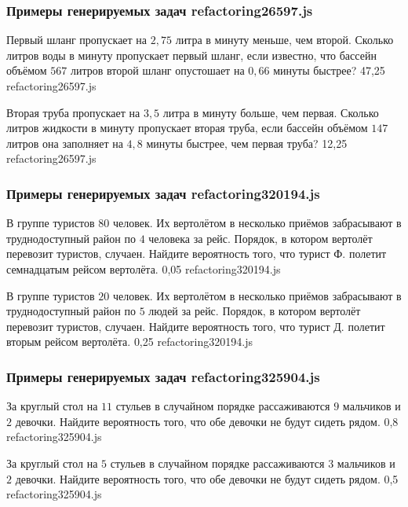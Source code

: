
\subsubsection*{Примеры генерируемых задач refactoring26597.js}
 
\par{Первый шланг пропускает на $2,75$ литра в минуту меньше, чем второй. Сколько литров воды в минуту пропускает первый шланг, если известно, что бассейн объёмом $567$ литров второй шланг опустошает на $0,66$ минуты быстрее? }{ 47,25 }{refactoring26597.js}
\par{Вторая труба пропускает на $3,5$ литра в минуту больше, чем первая. Сколько литров жидкости в минуту пропускает вторая труба, если бассейн объёмом $147$ литров она заполняет на $4,8$ минуты быстрее, чем первая труба? }{ 12,25 }{refactoring26597.js}


\subsubsection*{Примеры генерируемых задач refactoring320194.js}
 
\par{В группе туристов $80$ человек. Их вертолётом в несколько приёмов забрасывают в труднодоступный район по $4$ человека за рейс. Порядок, в котором вертолёт перевозит туристов, случаен. Найдите вероятность того, что турист Ф. полетит семнадцатым рейсом вертолёта. }{ 0,05 }{refactoring320194.js}
\par{В группе туристов $20$ человек. Их вертолётом в несколько приёмов забрасывают в труднодоступный район по $5$ людей за рейс. Порядок, в котором вертолёт перевозит туристов, случаен. Найдите вероятность того, что турист Д. полетит вторым рейсом вертолёта. }{ 0,25 }{refactoring320194.js}


\subsubsection*{Примеры генерируемых задач refactoring325904.js}
 
\par{За круглый стол на $11$ стульев в случайном порядке рассаживаются $9$ мальчиков и $2$ девочки. Найдите вероятность того, что обе девочки не будут сидеть рядом. }{ 0,8 }{refactoring325904.js}
\par{За круглый стол на $5$ стульев в случайном порядке рассаживаются $3$ мальчиков и $2$ девочки. Найдите вероятность того, что обе девочки не будут сидеть рядом. }{ 0,5 }{refactoring325904.js}

